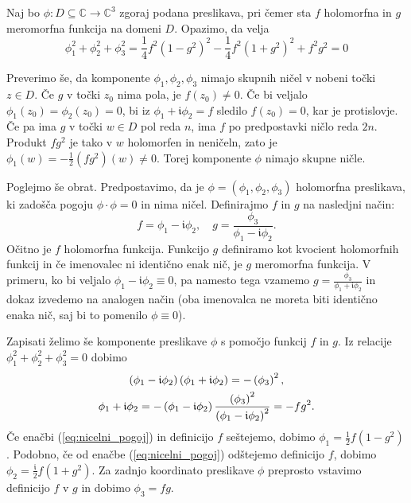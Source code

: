 \documentclass[fin1, tisk, bibtex]{fmfdelo}
\begin{document}
\begin{dokaz}
    Naj bo $\phi: D \subseteq \mathbb{C} \rightarrow \mathbb{C}^3$ zgoraj podana preslikava, pri čemer sta $f$ holomorfna in $g$ meromorfna funkcija na domeni $D$. Opazimo, da velja
    \begin{equation*}
        \phi_1^2+\phi_2^2+\phi_3^2 = \frac{1}{4} f^2\left(1-g^2\right)^2-\frac{1}{4} f^2\left(1+g^2\right)^2+f^2 g^2 = 0
    \end{equation*}

    Preverimo še, da komponente $\phi_1, \phi_2, \phi_3$ nimajo skupnih ničel v nobeni točki $z \in D$. Če $g$ v točki $z_0$ nima pola, je $f(z_0) \neq 0$. Če bi veljalo $\phi_1(z_0) = \phi_2(z_0) = 0$, bi iz $\phi_1 + \mathfrak{i}\phi_2 = f$ sledilo $f(z_0) = 0$, kar je protislovje. Če pa ima $g$ v točki $w \in D$ pol reda $n$, ima $f$ po predpostavki ničlo reda $2n$. Produkt $f g^2$ je tako v $w$ holomorfen in neničeln, zato je $\phi_1(w) = -\frac{1}{2}(f g^2)(w) \neq 0$. Torej komponente $\phi$ nimajo skupne ničle.

    Poglejmo še obrat. Predpostavimo, da je $\phi=\left(\phi_1, \phi_2, \phi_3\right)$ holomorfna preslikava, ki zadošča pogoju $\phi \cdot \phi=0$ in nima ničel. Definirajmo $f$ in $g$ na nasledjni način:
    \begin{equation*}
        f= \phi_1-\mathfrak{i} \phi_2, \quad g = \frac{\phi_3}{\phi_1-\mathfrak{i} \phi_2} .
    \end{equation*}
    Očitno je $f$ holomorfna funkcija. Funkcijo $g$ definiramo kot kvocient holomorfnih funkcij in če imenovalec ni identično enak nič, je $g$ meromorfna funkcija. V primeru, ko bi veljalo $\phi_1-\mathfrak{i} \phi_2 \equiv 0$, pa namesto tega vzamemo $g=\frac{\phi_3}{\phi_1+\mathfrak{i} \phi_2}$ in dokaz izvedemo na analogen način (oba imenovalca ne moreta biti identično enaka nič, saj bi to pomenilo $\phi \equiv 0$).
    
    Zapisati želimo še komponente preslikave $\phi$ s pomočjo funkcij $f$ in $g$. Iz relacije $\phi_1^2+\phi_2^2+\phi_3^2=0$ dobimo
    \begin{gather}
        \left(\phi_1-\mathfrak{i} \phi_2\right)\left(\phi_1+\mathfrak{i} \phi_2\right) =-\left(\phi_3\right)^2, \notag \\ \phi_1+\mathfrak{i} \phi_2  =-\left(\phi_1-\mathfrak{i} \phi_2\right) \frac{\left(\phi_3\right)^2}{\left(\phi_1-\mathfrak{i} \phi_2\right)^2} =-f g^2 \label{eq:nicelni_pogoj}.
    \end{gather}
    Če enačbi (\ref{eq:nicelni_pogoj}) in definicijo $f$ seštejemo, dobimo $\phi_1 =\frac{1}{2} f\left(1-g^2\right)$. Podobno, če od enačbe (\ref{eq:nicelni_pogoj}) odštejemo definicijo $f$, dobimo $\phi_2 =\frac{\mathfrak{i}}{2} f\left(1+g^2\right)$. Za zadnjo koordinato preslikave $\phi$ preprosto vstavimo definicijo $f$ v $g$ in dobimo $\phi_3=f g$.


\end{dokaz}
\end{document}
